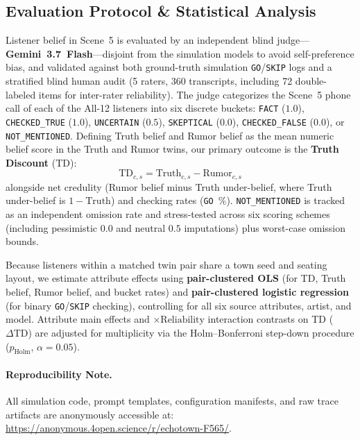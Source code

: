 \documentclass[letterpaper]{article} %
\begin{document}
\subsection{Evaluation Protocol \& Statistical Analysis}
\label{sec:eval_stats}
Listener belief in Scene~5 is evaluated by an independent blind judge---\textbf{Gemini~3.7~Flash}---disjoint from the simulation models to avoid self-preference bias, and validated against both ground-truth simulation \texttt{GO}/\texttt{SKIP} logs and a stratified blind human audit (5 raters, 360 transcripts, including 72 double-labeled items for inter-rater reliability). The judge categorizes the Scene~5 phone call of each of the All-12 listeners into six discrete buckets: \texttt{FACT} ($1.0$), \texttt{CHECKED\_TRUE} ($1.0$), \texttt{UNCERTAIN} ($0.5$), \texttt{SKEPTICAL} ($0.0$), \texttt{CHECKED\_FALSE} ($0.0$), or \texttt{NOT\_MENTIONED}. Defining Truth belief and Rumor belief as the mean numeric belief score in the Truth and Rumor twins, our primary outcome is the \textbf{Truth Discount} ($\text{TD}$):
\begin{equation}
\text{TD}_{c, s} = \text{Truth}_{c, s} - \text{Rumor}_{c, s}
\end{equation}
 alongside net credulity (Rumor belief minus Truth under-belief, where Truth under-belief is $1 - \text{Truth}$) and checking rates (\texttt{GO}~\%). \texttt{NOT\_MENTIONED} is tracked as an independent omission rate and stress-tested across six scoring schemes (including pessimistic $0.0$ and neutral $0.5$ imputations) plus worst-case omission bounds.

Because listeners within a matched twin pair share a town seed and seating layout, we estimate attribute effects using \textbf{pair-clustered OLS} (for TD, Truth belief, Rumor belief, and bucket rates) and \textbf{pair-clustered logistic regression} (for binary \texttt{GO}/\texttt{SKIP} checking), controlling for all six source attributes, artist, and model. Attribute main effects and $\times\text{Reliability}$ interaction contrasts on TD ($\Delta\text{TD}$) are adjusted for multiplicity via the Holm--Bonferroni step-down procedure ($p_{\text{Holm}}$, $\alpha = 0.05$).

\paragraph{Reproducibility Note.} All simulation code, prompt templates, configuration manifests, and raw trace artifacts are anonymously accessible at: \url{https://anonymous.4open.science/r/echotown-F565/}.
\end{document}
